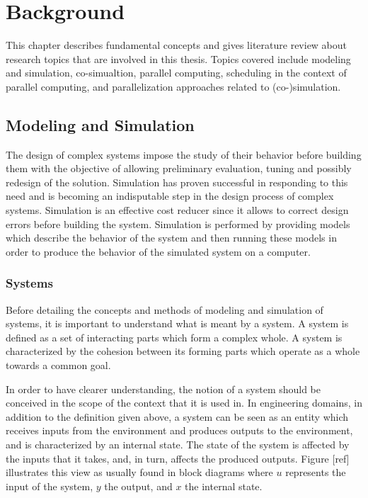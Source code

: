 \chapter{\label{ch:2-bkgnd}Background}

\minitoc

This chapter describes fundamental concepts and gives literature review about research topics that are involved in this thesis. Topics covered include modeling and simulation, co-simualtion, parallel computing, scheduling in the context of parallel computing, and parallelization approaches related to (co-)simulation. 

\section{Modeling and Simulation}

The design of complex systems impose the study of their behavior before building them with the objective of allowing preliminary evaluation, tuning and possibly redesign of the solution. Simulation has proven successful in responding to this need and is becoming an indisputable step in the design process of complex systems. Simulation is an effective cost reducer since it allows to correct design errors before building the system. Simulation is performed by providing models which describe the behavior of the system and then running these models in order to produce the behavior of the simulated system on a computer.   

\subsection{Systems}

Before detailing the concepts and methods of modeling and simulation of systems, it is important to understand what is meant by a system. A system is defined as a set of interacting parts which form a complex whole. A system is characterized by the cohesion between its forming parts which operate as a whole towards a common goal. 

In order to have clearer understanding, the notion of a system should be conceived in the scope of the context that it is used in. In engineering domains, in addition to the definition given above, a system can be seen as an entity which receives inputs from the environment and produces outputs to the environment, and is characterized by an internal state. The state of the system is affected by the inputs that it takes, and, in turn, affects the produced outputs. Figure [ref] illustrates this view as usually found in block diagrams where $u$ represents the input of the system, $y$ the output, and $x$ the internal state.

